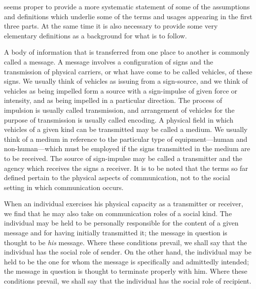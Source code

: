\documentclass[openany,nobib]{tufte-book}
\begin{document}
seems proper to provide a more systematic statement of
some of the assumptions and definitions which underlie some of the terms
and usages appearing in the first three parts. At the same time it is
also necessary to provide some very elementary definitions as a
background for what is to follow.

A body of information that is transferred from one place to another is
commonly called a message. A message involves a configuration of signs
and the transmission of physical carriers, or what have come to be
called vehicles, of these signs. We usually think of vehicles as issuing
from a sign-source, and we think of vehicles as being impelled form a
source with a sign-impulse of given force or intensity, and as being
impelled in a particular direction. The process of impulsion is usually
called transmission, and arrangement of vehicles for the purpose of
transmission is usually called encoding. A physical field in which
vehicles of a given kind can be transmitted may be called a medium. We
usually think of a medium in reference to the particular type of
equipment---human and non-human---which must be employed if the signs
transmitted in the medium are to be received. The source of sign-impulse
may be called a transmitter and the agency which receives the signs a
receiver. It is to be noted that the terms so far defined pertain to the
physical aspects of communication, not to the social setting in which
communication occurs.

When an individual exercises his physical capacity as a transmitter or
receiver, we find that he may also take on communication roles of a
social kind. The individual may be held to be personally responsible for
the content of a given message and for having initially transmitted it;
the message in question is thought to be \emph{his} message. Where these
conditions prevail, we shall say that the individual has the social role
of sender. On the other hand, the individual may be held to be the one
for whom the message is specifically and admittedly intended; the
message in question is thought to terminate properly with him. Where
these conditions prevail, we shall say that the individual has the
social role of recipient.
\end{document}
